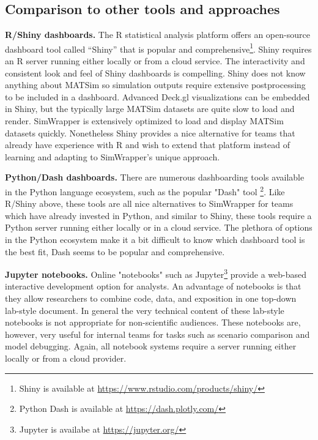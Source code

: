 \hypertarget{simwrapper-tool-comparison}{%
\subsection{Comparison to other tools and approaches}\label{simwrapper-tool-comparison}}

\textbf{R/Shiny dashboards.} The R statistical analysis platform offers an open-source dashboard tool called ``Shiny'' that is popular and comprehensive\footnote{Shiny is available at \url{https://www.rstudio.com/products/shiny/}}. Shiny requires an R server running either locally or from a cloud service. The interactivity and consistent look and feel of Shiny dashboards is compelling. Shiny does not know anything about MATSim so simulation outputs require extensive postprocessing to be included in a dashboard. Advanced Deck.gl visualizations can be embedded in Shiny, but the typically large MATSim datasets are quite slow to load and render. SimWrapper is extensively optimized to load and display MATSim datasets quickly. Nonetheless Shiny provides a nice alternative for teams that already have experience with R and wish to extend that platform instead of learning and adapting to SimWrapper's unique approach.

\textbf{Python/Dash dashboards.} There are numerous dashboarding tools available in the Python language ecosystem, such as the popular "Dash" tool \footnote{Python Dash is available at \url{https://dash.plotly.com/}}. Like R/Shiny above, these tools are all nice alternatives to SimWrapper for teams which have already invested in Python, and similar to Shiny, these tools require a Python server running either locally or in a cloud service. The plethora of options in the Python ecosystem make it a bit difficult to know which dashboard tool is the best fit, Dash seems to be popular and comprehensive.

\textbf{Jupyter notebooks.} Online "notebooks" such as Jupyter\footnote{Jupyter is availabe at \url{https://jupyter.org/}} provide a web-based interactive development option for analysts. An advantage of notebooks is that they allow researchers to combine code, data, and exposition in one top-down lab-style document. In general the very technical content of these lab-style notebooks is not appropriate for non-scientific audiences. These notebooks are, however, very useful for internal teams for tasks such as scenario comparison and model debugging. Again, all notebook systems require a server running either locally or from a cloud provider.

